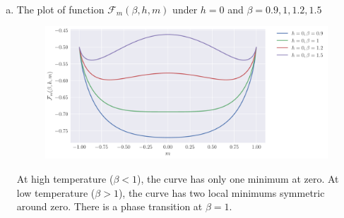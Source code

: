 \documentclass[a4paper,oneside,12pt]{article}
\begin{document}
\begin{solution} $\,$ 
\begin{enumerate}[(a)]
\item   
        The plot of function $ \mathcal{F}_m(\beta, h, m) $ under $ h = 0 $ and $ \beta = 0.9,1,1.2,1.5 $
        \begin{figure}[H]
            \centering
            \includegraphics[width=300pt]{hw1/hw1_2(a)_1.pdf}
        \end{figure}
        At high temperature ($ \beta < 1 $), the curve has only one minimum at zero.
        At low temperature ($ \beta > 1 $), the curve has two local minimums symmetric around zero.
        There is a phase transition at $ \beta = 1 $.


\end{enumerate}
\end{solution}
\end{document}
